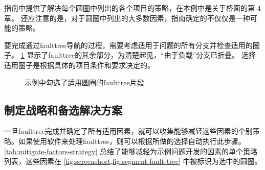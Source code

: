 指南中提供了解决每个圆圈中列出的各个项目的策略，在本例中是关于桥面的第 4 章。 还应注意的是，对于圆圈中列出的大多数因素，指南确定的不仅仅是一种可能的策略。

要完成通过\gls*{faulttree}导航的过程，需要考虑适用于问题的所有分支并检查适用的圈子。 \cref{fig:segment-fault-tree} 显示了\gls*{faulttree}的其余部分，为清楚起见，“由于负载”分支已折叠。 选择适用圈子是根据具体的项目条件和要求决定的。


\begin{figure}
  \caption{示例中勾选了适用圆圈的\gls*{faulttree}片段}\label{fig:segment-fault-tree}
\end{figure}

\subsection{制定战略和备选解决方案}

一旦\gls*{faulttree}完成并确定了所有适用因素，就可以收集能够减轻这些因素的个别策略。如果使用软件来处理\gls*{faulttree}，则可以根据所做的选择自动执行此步骤。\cref{tab:mitigate-factors-strategy} 总结了能够减轻为示例问题开发的因素的单个策略列表，这些因素在 \cref{fig:screenshort,fig:segment-fault-tree} 中被标识为选中的圆圈。

